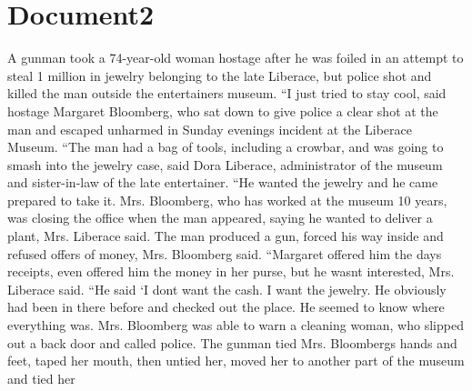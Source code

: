 \documentclass{article}
\begin{document}
\color[rgb]{0,0,0}\section{Document2}
\color[rgb]{0.596078431372549,0.7098039215686275,0.9490196078431372}A gunman took a 74-year-old woman hostage after he was \color[rgb]{0.40784313725490196,0.20784313725490197,0.03529411764705882}foiled in an attempt to steal 1 million in jewelry belonging to the late Liberace, but \color[rgb]{0.596078431372549,0.7098039215686275,0.9490196078431372}police shot and killed the \color[rgb]{0.40784313725490196,0.20784313725490197,0.03529411764705882}man outside the entertainers museum. ``I just tried to stay cool, said hostage Margaret Bloomberg, who sat down to give police a clear shot at the man and escaped unharmed in Sunday evenings incident at the Liberace Museum. ``The man had a bag of tools, including a crowbar, and was going to smash into the jewelry case, said Dora Liberace, administrator of the museum and sister-in-law of the late entertainer. ``He wanted the jewelry and he came prepared to take it. \color[rgb]{0.7098039215686275,0.24705882352941178,0.8784313725490196}Mrs. Bloomberg, who has \color[rgb]{0.40784313725490196,0.20784313725490197,0.03529411764705882}worked at the museum 10 years, was closing the office when the man appeared, saying he wanted to deliver a plant, \color[rgb]{0.7098039215686275,0.24705882352941178,0.8784313725490196}Mrs. Liberace said. The \color[rgb]{0.40784313725490196,0.20784313725490197,0.03529411764705882}man produced a gun, forced his way \color[rgb]{0.7098039215686275,0.24705882352941178,0.8784313725490196}inside and refused offers of money, Mrs. Bloomberg said. \color[rgb]{0.40784313725490196,0.20784313725490197,0.03529411764705882}``Margaret offered him the days receipts, even offered him the money in \color[rgb]{0.7098039215686275,0.24705882352941178,0.8784313725490196}her \color[rgb]{0.40784313725490196,0.20784313725490197,0.03529411764705882}purse, but he wasnt interested, \color[rgb]{0.7098039215686275,0.24705882352941178,0.8784313725490196}Mrs. Liberace said. ``He said `I \color[rgb]{0.40784313725490196,0.20784313725490197,0.03529411764705882}dont want the cash. I want the jewelry. He obviously had been in there before and checked out the place. He seemed to know where everything was. \color[rgb]{0.7098039215686275,0.24705882352941178,0.8784313725490196}Mrs. Bloomberg was \color[rgb]{0.40784313725490196,0.20784313725490197,0.03529411764705882}able to warn a cleaning \color[rgb]{0.7098039215686275,0.24705882352941178,0.8784313725490196}woman, who \color[rgb]{0.40784313725490196,0.20784313725490197,0.03529411764705882}slipped out a back door and called police. The gunman tied \color[rgb]{0.7098039215686275,0.24705882352941178,0.8784313725490196}Mrs. Bloombergs \color[rgb]{0.40784313725490196,0.20784313725490197,0.03529411764705882}hands and feet, taped \color[rgb]{0.7098039215686275,0.24705882352941178,0.8784313725490196}her mouth, then untied her, moved her to \color[rgb]{0.40784313725490196,0.20784313725490197,0.03529411764705882}another part of the museum and tied \color[rgb]{0.7098039215686275,0.24705882352941178,0.8784313725490196}her 
\end{document}
